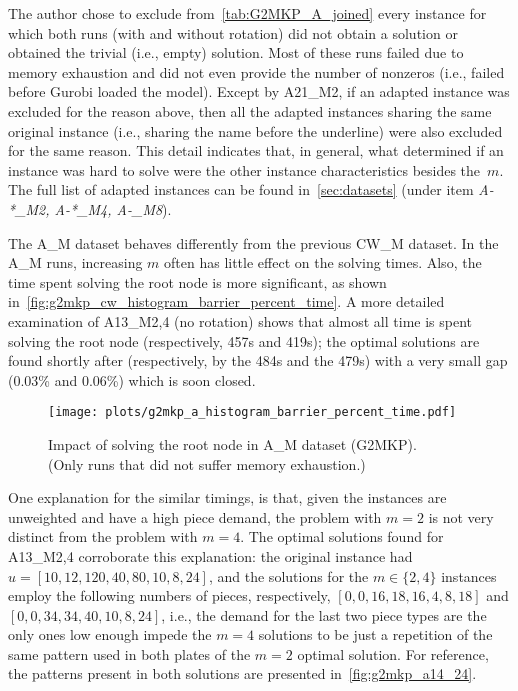 The author chose to exclude from~\cref{tab:G2MKP_A_joined} every instance for which both runs (with and without rotation) did not obtain a solution or obtained the trivial (i.e., empty) solution.
Most of these runs failed due to memory exhaustion and did not even provide the number of nonzeros (i.e., failed before Gurobi loaded the model).
Except by A21\_M2, if an adapted instance was excluded for the reason above, then all the adapted instances sharing the same original instance (i.e., sharing the name before the underline) were also excluded for the same reason.
This detail indicates that, in general, what determined if an instance was hard to solve were the other instance characteristics besides the~\(m\).
The full list of adapted instances can be found in~\cref{sec:datasets} (under item \emph{A-*\_M2, A-*\_M4, A-\_M8}).

The A\_M dataset behaves differently from the previous CW\_M dataset.
In the A\_M runs, increasing \(m\) often has little effect on the solving times.
Also, the time spent solving the root node is more significant, as shown in~\cref{fig:g2mkp_cw_histogram_barrier_percent_time}.
A more detailed examination of A13\_M{2,4} (no rotation) shows that almost all time is spent solving the root node (respectively, 457s and 419s); the optimal solutions are found shortly after (respectively, by the 484s and the 479s) with a very small gap (0.03\% and 0.06\%) which is soon closed.

\begin{figure}[!t]
  \caption{Impact of solving the root node in A\_M dataset (G2MKP).\\(Only runs that did not suffer memory exhaustion.)}
  \center
  \texttt{[image: plots/g2mkp\_a\_histogram\_barrier\_percent\_time.pdf]}
  \legend{The histogram has 10 bins, each bin aggregates the runs spending \((x, x + 10]\)\% of their time solving the root node (\(x \in [0, 10, 20, 30, 40, 50, 60, 70, 80, 90]\)). Souce: the author.}
  \label{fig:g2mkp_a_histogram_barrier_percent_time}
\end{figure}

One explanation for the similar timings, is that, given the instances are unweighted and have a high piece demand, the problem with \(m = 2\) is not very distinct from the problem with \(m = 4\).
The optimal solutions found for A13\_M{2,4} corroborate this explanation: the original instance had \(u = [10, 12, 120, 40, 80, 10, 8, 24]\), and the solutions for the \(m \in \{2, 4\}\) instances employ the following numbers of pieces, respectively, \([0, 0, 16, 18, 16, 4, 8, 18]\) and \([0, 0, 34, 34, 40, 10, 8, 24]\), i.e., the demand for the last two piece types are the only ones low enough impede the \(m = 4\) solutions to be just a repetition of the same pattern used in both plates of the \(m = 2\) optimal solution. For reference, the patterns present in both solutions are presented in~\cref{fig:g2mkp_a14_24}.

